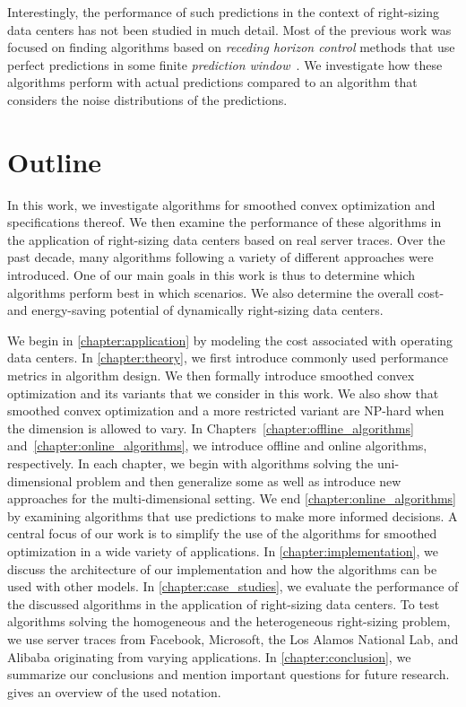Interestingly, the performance of such predictions in the context of right-sizing data centers has not been studied in much detail. Most of the previous work was focused on finding algorithms based on \emph{receding horizon control} methods that use perfect predictions in some finite \emph{prediction window}~\cite{Lin2012, Chen2015, Badiei2015, Chen2016, Li2018, Lin2019}. We investigate how these algorithms perform with actual predictions compared to an algorithm that considers the noise distributions of the predictions.

\section{Outline}

In this work, we investigate algorithms for smoothed convex optimization and specifications thereof. We then examine the performance of these algorithms in the application of right-sizing data centers based on real server traces. Over the past decade, many algorithms following a variety of different approaches were introduced. One of our main goals in this work is thus to determine which algorithms perform best in which scenarios. We also determine the overall cost- and energy-saving potential of dynamically right-sizing data centers.

We begin in \cref{chapter:application} by modeling the cost associated with operating data centers. In \cref{chapter:theory}, we first introduce commonly used performance metrics in algorithm design. We then formally introduce smoothed convex optimization and its variants that we consider in this work. We also show that smoothed convex optimization and a more restricted variant are NP-hard when the dimension is allowed to vary. In Chapters~\ref{chapter:offline_algorithms} and~\ref{chapter:online_algorithms}, we introduce offline and online algorithms, respectively. In each chapter, we begin with algorithms solving the uni-dimensional problem and then generalize some as well as introduce new approaches for the multi-dimensional setting. We end \cref{chapter:online_algorithms} by examining algorithms that use predictions to make more informed decisions. A central focus of our work is to simplify the use of the algorithms for smoothed optimization in a wide variety of applications. In \cref{chapter:implementation}, we discuss the architecture of our implementation and how the algorithms can be used with other models. In \cref{chapter:case_studies}, we evaluate the performance of the discussed algorithms in the application of right-sizing data centers. To test algorithms solving the homogeneous and the heterogeneous right-sizing problem, we use server traces from Facebook, Microsoft, the Los Alamos National Lab, and Alibaba originating from varying applications. In \cref{chapter:conclusion}, we summarize our conclusions and mention important questions for future research.  gives an overview of the used notation.

